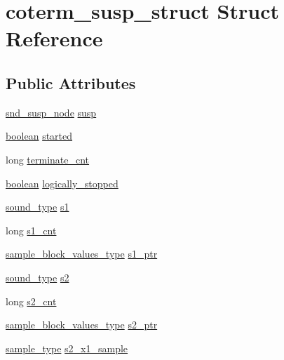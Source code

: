 \hypertarget{structcoterm__susp__struct}{}\section{coterm\+\_\+susp\+\_\+struct Struct Reference}
\label{structcoterm__susp__struct}
\subsection*{Public Attributes}
\begin{DoxyCompactItemize}
\item 
\hyperlink{sound_8h_a6b268203688a934bd798ceb55f85d4c0}{snd\+\_\+susp\+\_\+node} \hyperlink{structcoterm__susp__struct_ad448c0d291f1010e168748f3f7f74631}{susp}
\item 
\hyperlink{cext_8h_a7670a4e8a07d9ebb00411948b0bbf86d}{boolean} \hyperlink{structcoterm__susp__struct_a750cd51a748ea2bf63c20579f126e8fc}{started}
\item 
long \hyperlink{structcoterm__susp__struct_aaccfa664ccdec62b824145012e76c2e7}{terminate\+\_\+cnt}
\item 
\hyperlink{cext_8h_a7670a4e8a07d9ebb00411948b0bbf86d}{boolean} \hyperlink{structcoterm__susp__struct_aa87096e6b267e63a7f4801543533836b}{logically\+\_\+stopped}
\item 
\hyperlink{sound_8h_a792cec4ed9d6d636d342d9365ba265ea}{sound\+\_\+type} \hyperlink{structcoterm__susp__struct_accdf66dd83db262a64598c2291c6ef43}{s1}
\item 
long \hyperlink{structcoterm__susp__struct_afe4205a214331be9616c569842bd327a}{s1\+\_\+cnt}
\item 
\hyperlink{sound_8h_a83d17f7b465d1591f27cd28fc5eb8a03}{sample\+\_\+block\+\_\+values\+\_\+type} \hyperlink{structcoterm__susp__struct_a41e38c5f97eef7748421706ce307aff3}{s1\+\_\+ptr}
\item 
\hyperlink{sound_8h_a792cec4ed9d6d636d342d9365ba265ea}{sound\+\_\+type} \hyperlink{structcoterm__susp__struct_a05b6ec317396a4ce3708cb651972aca0}{s2}
\item 
long \hyperlink{structcoterm__susp__struct_a9cc8880fffe8fa8b68ffc8558856292d}{s2\+\_\+cnt}
\item 
\hyperlink{sound_8h_a83d17f7b465d1591f27cd28fc5eb8a03}{sample\+\_\+block\+\_\+values\+\_\+type} \hyperlink{structcoterm__susp__struct_a09854a76a1dfb6c9c105d51965517265}{s2\+\_\+ptr}
\item 
\hyperlink{sound_8h_a3a9d1d4a1c153390d2401a6e9f71b32c}{sample\+\_\+type} \hyperlink{structcoterm__susp__struct_ae693d1ea090632e36bbb31434d01ca20}{s2\+\_\+x1\+\_\+sample}

\end{DoxyCompactItemize}
